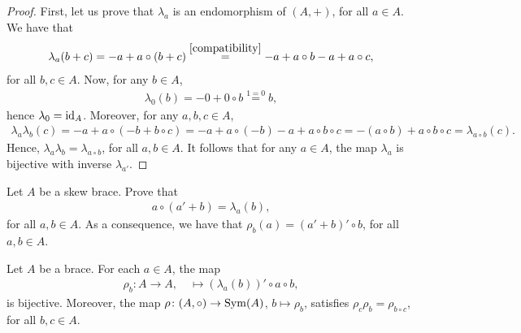     \begin{proof}
        First, let us prove that $\lambda_a$ is an endomorphism of $(A,+)$, for all $a\in A$.
        We have that
        \begin{align*}
            \lambda_a(b+c) = -a+a\circ (b+c) \overset{\eqref{compatibility}}{=} -a +a\circ b -a +a\circ c,
        \end{align*}
        for all $b,c\in A$. Now, for any $b\in A$,
        \begin{align*}
            \lambda_0(b) = - 0 + 0 \circ b \overset{1=0}{=} b,
        \end{align*}
        hence $\lambda_0=\operatorname{id}_A$. Moreover, for any $a,b,c\in A$, 
        \begin{align*}
            \lambda_a\lambda_b(c) = -a +a\circ(-b+b\circ c) = -a + a\circ(-b) - a + a\circ b \circ c=-(a\circ b) + a\circ b \circ c = \lambda_{a\circ b}(c).
        \end{align*}
        Hence, $\lambda_a\lambda_b=\lambda_{a\circ b}$, for all $a,b\in A$. It follows that for any $a\in A$, the map $\lambda_a$ is bijective with inverse $\lambda_{a'}$. 
    \end{proof}

    \begin{exercise}\label{ex:rho}
        Let $A$ be a skew brace. Prove that 
        \begin{align*}
            a\circ(a'+b) = \lambda_a(b),
        \end{align*}
        for all $a,b\in A$. As a consequence, we have that $\rho_b(a)=(a'+b)'\circ b$, for all $a,b\in A$.
    \end{exercise}

    \begin{proposition}\label{prop:rho}
        Let $A$ be a brace. For each $a\in A$, the map
        \begin{align*}
            \rho_b\colon A\to A,\quad
            \mapsto (\lambda_a(b))'\circ a\circ b,
        \end{align*}
        is bijective. Moreover, the map 
        $\rho\colon (A,\circ)\to\operatorname{Sym}(A)$, $b\mapsto\rho_b$, satisfies $\rho_c\rho_b=\rho_{b\circ c}$, for all $b,c\in A$. 
    \end{proposition}

